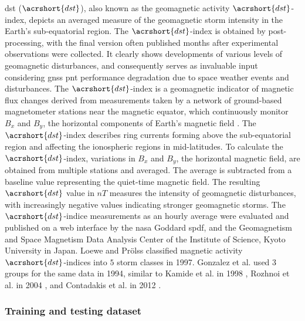 \let\LaTeXcline\cline\documentclass[sn-mathphys-num]{sn-jnl}\let\cline\LaTeXcline
\begin{document}
\acrlong{dst} ($\acrshort{dst}$), also known as the geomagnetic activity $\acrshort{dst}$-index, depicts an averaged measure of the geomagnetic storm intensity in the Earth's sub-equatorial region. The $\acrshort{dst}$-index is obtained by post-processing, with the final version often published months after experimental observations were collected. It clearly shows developments of various levels of geomagnetic disturbances, and consequently serves as invaluable input considering \acrshort{gnss} \acrshort{pnt} performance degradation due to space weather events and disturbances. The $\acrshort{dst}$-index is a geomagnetic indicator of magnetic flux changes derived from measurements taken by a network of ground-based magnetometer stations near the magnetic equator, which continuously monitor $B_{x}$ and $B_{y}$, the horizontal components of Earth's magnetic field \cite{zolesi2014ionospheric}. The $\acrshort{dst}$-index describes ring currents forming above the sub-equatorial region and affecting the ionospheric regions in mid-latitudes. To calculate the $\acrshort{dst}$-index, variations in $B_{x}$ and $B_{y}$, the horizontal magnetic field, are obtained from multiple stations and averaged. The average is subtracted from a baseline value representing the quiet-time magnetic field. The resulting $\acrshort{dst}$ value in $nT$ measures the intensity of geomagnetic disturbances, with increasingly negative values indicating stronger geomagnetic storms. The $\acrshort{dst}$-indice measurements as an hourly average were evaluated and published on a web interface by the \acrshort{nasa} Goddard \acrshort{spdf}, and the Geomagnetism and Space Magnetism Data Analysis Center of the Institute of Science, Kyoto University in Japan. Loewe and Prölss \cite{loewe1997classification} classified magnetic activity $\acrshort{dst}$-indices into $5$ storm classes in 1997. Gonzalez et al. \cite{gonzalez1994geomagnetic} used $3$ groups for the same data in 1994, similar to Kamide et al. in 1998 \cite{kamide1998two}, Rozhnoi et al. in 2004 \cite{rozhnoi2004middle}, and Contadakis et al. in 2012 \cite{contadakis2012total}.

\subsubsection{Training and testing dataset}
\end{document}
